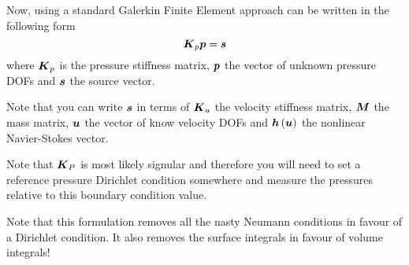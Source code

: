 Now, using a standard Galerkin Finite Element approach
 can be written in the following form
 \begin{equation}
   \matr{K}_{p}\vect{p}=\vect{s}
  \label{eqn:PressurePoissonFinalWeakForm}
\end{equation}
where $\matr{K}_{p}$ is the pressure stiffness matrix, $\vect{p}$ the vector of unknown
pressure DOFs and $\vect{s}$ the source vector. 

Note that you can write
$\vect{s}$ in terms of $\matr{K}_{u}$ the velocity
stiffness matrix, $\matr{M}$ the mass matrix, $\vect{u}$ the vector of know
velocity DOFs and $\fnof{\vect{h}}{\vect{u}}$ the nonlinear Navier-Stokes
vector.

Note that $\matr{K}_{P}$ is most likely signular and therefore you will need to
set a reference pressure Dirichlet condition somewhere and measure the
pressures relative to this boundary condition value.

Note that this formulation removes all the nasty Neumann conditions in favour
of a Dirichlet condition. It also removes the surface integrals in favour of
volume integrals!

\newpage 
